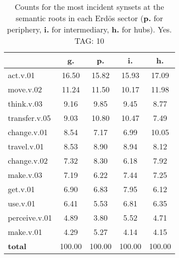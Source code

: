 \begin{table}[h!]
\begin{center}
\begin{tabular}{| l || c | c | c | c |}\hline
 & {\bf g.} & {\bf p.} & {\bf i.} & {\bf h.} \\\hline\hline
act.v.01 & 16.50  & 15.82  & 15.93  & 17.09 \\\hline
move.v.02 & 11.24  & 11.50  & 10.17  & 11.98 \\\hline
think.v.03 & 9.16  & 9.85  & 9.45  & 8.77 \\\hline
transfer.v.05 & 9.03  & 10.80  & 10.47  & 7.49 \\\hline
change.v.01 & 8.54  & 7.17  & 6.99  & 10.05 \\\hline
travel.v.01 & 8.53  & 8.90  & 8.94  & 8.12 \\\hline
change.v.02 & 7.32  & 8.30  & 6.18  & 7.92 \\\hline
make.v.03 & 7.19  & 6.22  & 7.44  & 7.25 \\\hline
get.v.01 & 6.90  & 6.83  & 7.95  & 6.12 \\\hline
use.v.01 & 6.41  & 5.53  & 6.81  & 6.35 \\\hline
perceive.v.01 & 4.89  & 3.80  & 5.52  & 4.71 \\\hline
make.v.01 & 4.29  & 5.27  & 4.14  & 4.15 \\\hline\hline
{{\bf total}} & 100.00  & 100.00  & 100.00  & 100.00 \\\hline
\end{tabular}
\caption{Counts for the most incident synsets at the semantic roots in each Erd\"os sector ({\bf p.} for periphery, {\bf i.} for intermediary, {\bf h.} for hubs). Yes. TAG: 10}
\end{center}
\end{table}